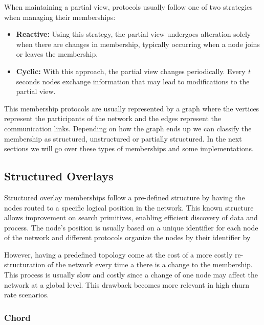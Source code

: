 When maintaining a partial view, protocols usually follow one of two strategies
when managing their memberships:

\begin{itemize}
  \item \textbf{Reactive:} Using this strategy, the partial view undergoes alteration solely
when there are changes in membership, typically occurring when a node joins or leaves the membership.
  \item \textbf{Cyclic:} With this approach, the partial view changes periodically.
Every \textit{t} seconds nodes exchange information that may lead to modifications to the
partial view.
\end{itemize}

This membership protocols are usually represented by a graph where the vertices represent
the participants of the network and the edges represent the communication links.
Depending on how the graph ends up we can classify the membership as structured,
unstructured or partially structured. In the next sections we will go over these
types of memberships and some implementations.

\subsection{Structured Overlays}\label{sub:structured_overlays}

Structured overlay memberships follow a pre-defined structure by having the nodes
routed to a specific logical position in the network. This known structure allows
improvement on search primitives, enabling efficient discovery of data and process.
The node's position is usually based on a unique identifier for each node of the
network and different protocols organize the nodes by their identifier by 

However, having a predefined topology come at the cost of a more costly re-structuration
of the network every time a there is a change to the membership. This process
is usually slow and costly since a change of one node may affect
the network at a global level. This drawback becomes more relevant in high churn rate
scenarios.

\subsubsection{Chord}\label{subsec:chord}

